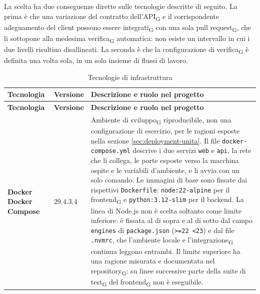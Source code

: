 \documentclass[a4paper, 10pt]{article}
\newcommand{\vPython}{3.12}     %
\newcommand{\vNode}{22}         %
\newcommand{\vDocker}{29.4.3}
\newcommand{\vCompose}{5.1.4}
\newenvironment{tabellatec}[2]{%
  \begingroup
  \small
  \setlength{\tabcolsep}{4pt}
  \begin{longtable}{|p{2.8cm}|p{1.5cm}|p{9.2cm}|}
    \caption{#1}\label{#2}\\
    \hline
    \textbf{Tecnologia} & \textbf{Versione} & \textbf{Descrizione e ruolo nel progetto} \\
    \hline
    \endfirsthead
    \hline
    \textbf{Tecnologia} & \textbf{Versione} & \textbf{Descrizione e ruolo nel progetto} \\
    \hline
    \endhead
}{%
  \end{longtable}
  \endgroup
}
\begin{document}
La scelta ha due conseguenze dirette sulle tecnologie descritte di seguito. La prima è che una variazione del contratto dell'API\textsubscript{G} e il corrispondente adeguamento del client possono essere integrati\textsubscript{G} con una sola pull request\textsubscript{G}, che li sottopone alla medesima verifica\textsubscript{G} automatica: non esiste un intervallo in cui i due livelli risultino disallineati. La seconda è che la configurazione di verifica\textsubscript{G} è definita una volta sola, in un solo insieme di flussi di lavoro.

\begin{tabellatec}{Tecnologie di infrastruttura}{tab:tec-infrastruttura}
    \textbf{Docker \newline Docker Compose} & \vDocker \newline \vCompose & Ambiente di sviluppo\textsubscript{G} riproducibile, non una configurazione di esercizio, per le ragioni esposte nella sezione \ref{sec:deployment-unita}. Il file \texttt{docker-compose.yml} descrive i due servizi \texttt{web} e \texttt{api}, la rete che li collega, le porte esposte verso la macchina ospite e le variabili d'ambiente, e li avvia con un solo comando. Le immagini di base sono fissate dai rispettivi \texttt{Dockerfile}: \texttt{node:\vNode{}-alpine} per il frontend\textsubscript{G} e \texttt{python:\vPython{}-slim} per il backend. La linea di Node.js non è scelta soltanto come limite inferiore: è fissata al di sopra e al di sotto dal campo \texttt{engines} di \texttt{package.json} (\texttt{>=\vNode{} <23}) e dal file \texttt{.nvmrc}, che l'ambiente locale e l'integrazione\textsubscript{G} continua leggono entrambi. Il limite superiore ha una ragione misurata e documentata nel repository\textsubscript{G}: su linee successive parte della suite di test\textsubscript{G} del frontend\textsubscript{G} non è eseguibile. \\ \hline


\end{tabellatec}
\end{document}
